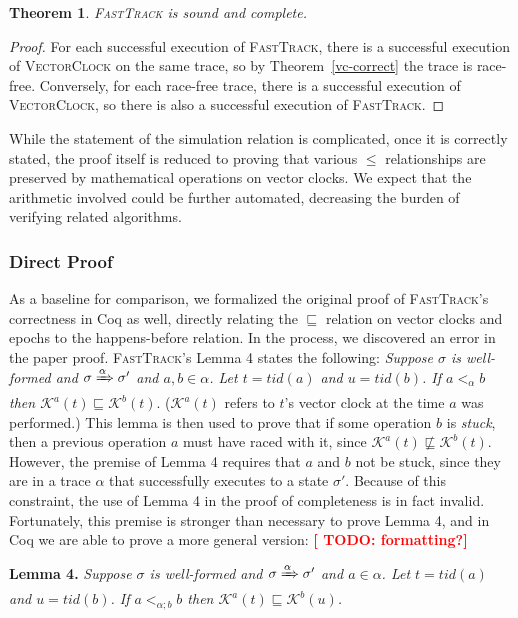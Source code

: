 \documentclass[preprint, 10pt]{sigplanconf}
\newcommand{\TODO}[1]{\textbf{\textcolor{red}{[ TODO: #1]}}}
\newcommand{\VCalg}{\textsc{VectorClock}\xspace}
\newcommand{\FT}{\textsc{FastTrack}\xspace}
\newtheorem{theorem}{Theorem}
\begin{document}
\begin{theorem}\FT is sound and complete.\end{theorem}
\begin{proof}For each successful execution of \FT, there is a successful execution of \VCalg on the same trace, so by Theorem~\ref{vc-correct} the trace is race-free. Conversely, for each race-free trace, there is a successful execution of \VCalg, so there is also a successful execution of \FT.\end{proof}

While the statement of the simulation relation is complicated, once it is correctly stated, the proof itself is reduced to proving that various $\le$ relationships are preserved by mathematical operations on vector clocks. We expect that the arithmetic involved could be further automated, decreasing the burden of verifying related algorithms.

\subsubsection{Direct Proof}
\label{bug}
As a baseline for comparison, we formalized the original proof of \FT's correctness in Coq as well, directly relating the $\sqsubseteq$ relation on vector clocks and epochs to the happens-before relation. In the process, we discovered an error in the paper proof. \FT's Lemma 4 states the following: {\it Suppose $\sigma$ is well-formed and $\sigma \xRightarrow{\alpha} \sigma'$ and $a, b \in \alpha$. Let $t = \mathit{tid}(a)$ and $u = \mathit{tid}(b)$. If $a <_{\alpha} b$ then $\mathcal{K}^a(t) \sqsubseteq \mathcal{K}^b(t).$} ($\mathcal{K}^a(t)$ refers to $t$'s vector clock at the time $a$ was performed.) This lemma is then used to prove that if some operation $b$ is \emph{stuck}, then a previous operation $a$ must have raced with it, since $\mathcal{K}^a(t) \not\sqsubseteq \mathcal{K}^b(t)$. However, the premise of Lemma 4 requires that $a$ and $b$ not be stuck, since they are in a trace $\alpha$ that successfully executes to a state $\sigma'$. Because of this constraint, the use of Lemma 4 in the proof of completeness is in fact invalid. Fortunately, this premise is stronger than necessary to prove Lemma 4, and in Coq we are able to prove a more general version: \TODO{formatting?}

\noindent\textbf{Lemma 4.} {\it Suppose $\sigma$ is well-formed and $\sigma \xRightarrow{\alpha} \sigma'$ and $a \in \alpha$. Let $t = \mathit{tid}(a)$ and $u = \mathit{tid}(b)$. If $a <_{\alpha; b} b$ then $\mathcal{K}^a(t) \sqsubseteq \mathcal{K}^b(u)$.}
\end{document}
